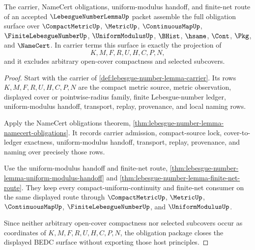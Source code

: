 \begin{theorem}
\label{thm:lebesgue-number-lemma-obligation-closure-package}
The carrier, NameCert obligations, uniform-modulus handoff, and finite-net route of an accepted $\LebesgueNumberLemmaUp$ packet assemble the full obligation surface over $\CompactMetricUp$, $\MetricUp$, $\ContinuousMapUp$, $\FiniteLebesgueNumberUp$, $\UniformModulusUp$, $\BHist$, $\hsame$, $\Cont$, $\Pkg$, and $\NameCert$. In carrier terms this surface is exactly the projection of
$$
K,M,F,R,U,H,C,P,N,
$$
and it excludes arbitrary open-cover compactness and selected subcovers.
\end{theorem}
\begin{proof}
Start with the carrier of \autoref{def:lebesgue-number-lemma-carrier}. Its rows $K,M,F,R,U,H,C,P,N$ are the compact metric source, metric observation, displayed cover or pointwise-radius family, finite Lebesgue-number ledger, uniform-modulus handoff, transport, replay, provenance, and local naming rows.

Apply the NameCert obligations theorem, \autoref{thm:lebesgue-number-lemma-namecert-obligations}. It records carrier admission, compact-source lock, cover-to-ledger exactness, uniform-modulus handoff, transport, replay, provenance, and naming over precisely those rows.

Use the uniform-modulus handoff and finite-net route, \autoref{thm:lebesgue-number-lemma-uniform-modulus-handoff} and \autoref{thm:lebesgue-number-lemma-finite-net-route}. They keep every compact-uniform-continuity and finite-net consumer on the same displayed route through $\CompactMetricUp$, $\MetricUp$, $\ContinuousMapUp$, $\FiniteLebesgueNumberUp$, and $\UniformModulusUp$.

Since neither arbitrary open-cover compactness nor selected subcovers occur as coordinates of $K,M,F,R,U,H,C,P,N$, the obligation package closes the displayed BEDC surface without exporting those host principles.
\end{proof}




